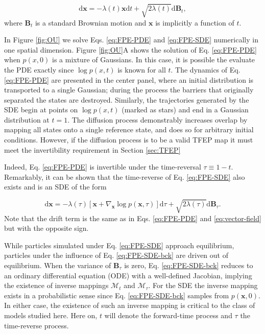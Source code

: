 \documentclass[9pt,twocolumn,twoside]{pnas-new}
\begin{document}
\begin{equation}
    \mathrm{d}\mathbf{x} = -\lambda(t)\mathbf{x}\mathrm{d}t + \sqrt{2\lambda(t)}\mathrm{d}\mathbf{B}_t,
    \label{eq:FPE-SDE}
\end{equation}
where $\mathbf{B}_t$ is a standard Brownian motion and $\mathbf{x}$ is implicitly a function of $t$. 


In Figure \ref{fig:OU} we solve Eqs. \ref{eq:FPE-PDE} and \ref{eq:FPE-SDE} numerically in one spatial dimension. Figure \ref{fig:OU}A shows the solution of Eq. \ref{eq:FPE-PDE} when $p(x,0)$ is a mixture of Gaussians. In this case, it is possible the evaluate the PDE exactly since $\log p(x,t)$ is known for all $t$. The dynamics of Eq. \ref{eq:FPE-PDE} are presented in the center panel, where an initial distribution is transported to a single Gaussian; during the process the barriers that originally separated the states are destroyed. Similarly, the trajectories generated by the SDE begin at points on $\log p(x,t)$ (marked as stars) and end in a Gaussian distribution at $t=1$. The diffusion process demonstrably increases overlap by mapping all states onto a single reference state, and does so for arbitrary initial conditions. However, if the diffusion process is to be a valid TFEP map it must meet the invertibility requirement in Section \ref{sec:TFEP}


Indeed, Eq. \ref{eq:FPE-PDE} is invertible under the time-reversal $\tau \equiv 1 - t$. Remarkably, it can be shown that the time-reverse of Eq. \ref{eq:FPE-SDE} also exists \cite{Anderson1982} and is an SDE  of the form

\begin{equation}
    \mathrm{d}\mathbf{x} = -\lambda(\tau)\left[ \mathbf{x} + \nabla_{\mathbf{x}}\log p(\mathbf{x}, \tau)\right]\mathrm{d}\tau + \sqrt{2\lambda(\tau)}\mathrm{d}\mathbf{B}_\tau.
    \label{eq:FPE-SDE-bck}
\end{equation}
Note that the drift term is the same as in Eqs. \ref{eq:FPE-PDE} and \ref{eq:vector-field} but with the opposite sign.

While particles simulated under Eq. \ref{eq:FPE-SDE} approach equilibrium, particles under the influence of Eq. \ref{eq:FPE-SDE-bck} are driven out of equilibrium. When the variance of $\mathbf{B}_\tau$ is zero, Eq. \ref{eq:FPE-SDE-bck} reduces to an ordinary differential equation (ODE) with a well-defined Jacobian, implying the existence of inverse mappings $\mathcal{M}_t$ and $\mathcal{M}_\tau$. For the SDE the inverse mapping exists in a probabilistic sense since Eq. \ref{eq:FPE-SDE-bck} samples from $p(\mathbf{x},0)$. In either case, the existence of such an inverse mapping is critical to the class of models studied here.  Here on, $t$ will denote the forward-time process and $\tau$ the time-reverse process. 
\end{document}
